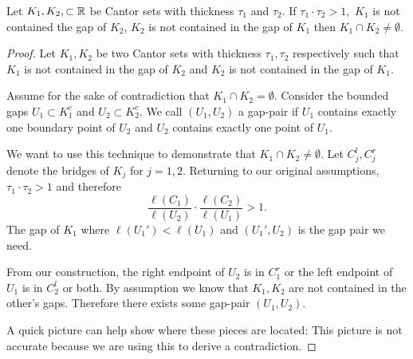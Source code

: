 \begin{lemma}
    Let $K_1, K_2, \subset \mathbb{R}$ be Cantor sets with thickness $\tau_1$ and  $\tau_2$.  If $\tau_1 \cdot \tau_2 >1,$  $K_1$ is not contained the gap of $K_2$, $K_2$ is not contained in the gap of $K_1$ then $K_1 \cap K_2 \neq \emptyset.$
\end{lemma}
\begin{proof}
    Let $K_1, K_2$ be two Cantor sets with thickness $\tau_1, \tau_2$ respectively such that $K_1$ is not contained in the gap of $K_2$ and $K_2$ is not contained in the gap of $K_1$.  

    Assume for the sake of contradiction that $K_1 \cap K_2 = \emptyset$.  Consider the bounded gaps $U_1 \subset K_1^c$ and $U_2 \subset K_2^c$.  We call $(U_1, U_2)$ a gap-pair if $U_1$ contains exactly one boundary point of $U_2$ and $U_2$ contains exactly one point of $U_1$.  

    We want to use this technique to demonstrate that $K_1 \cap K_2 \neq \emptyset.$ Let $C_j^l, C_j^r$ denote the bridges of $K_j$ for $j = 1,2$.  Returning to our original assumptions, $\tau_1 \cdot \tau_2 > 1$ and therefore $$\frac{\ell(C_1)}{\ell(U_2)} \cdot \frac{\ell(C_2)}{\ell(U_1)} > 1.$$  
    The gap of $K_1$ where $\ell(U_1') < \ell(U_1)$ and $(U_1', U_2)$ is the gap pair we need.  
    
    From our construction, the right endpoint of $U_2$ is in $C_1^r$ or the left endpoint of $U_1$ is in $C_2^l$ or both.  By assumption we know that $K_1, K_2$ are not contained in the other's gaps. Therefore there exists some gap-pair $(U_1, U_2).$


    A quick picture can help show where these pieces are located:  This picture is not accurate because we are using this to derive a contradiction.
    
\end{proof}

